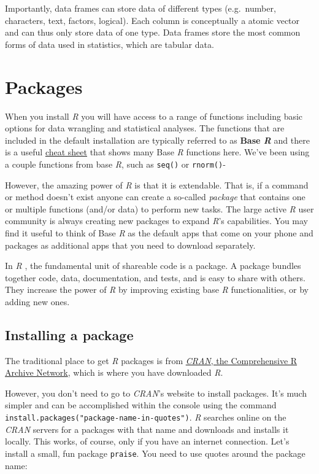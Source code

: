 \documentclass[
]{scrartcl}
\begin{document}
Importantly, data frames can store data of different types (e.g.~number, characters, text, factors, logical). Each column is conceptually a atomic vector and can thus only store data of one type. Data frames store the most common forms of data used in statistics, which are tabular data.

\hypertarget{packages}{%
\section{Packages}\label{packages}}

When you install \emph{R} you will have access to a range of functions including basic options for data wrangling and statistical analyses. The functions that are included in the default installation are typically referred to as \textbf{Base \emph{R}} and there is a useful \protect\hyperlink{cheatsheets}{cheat sheet} that shows many Base \emph{R} functions here. We've been using a couple functions from base \emph{R}, such as \texttt{seq()} or \texttt{rnorm()}-

However, the amazing power of \emph{R} is that it is extendable. That is, if a command or method doesn't exist anyone can create a so-called \emph{package} that contains one or multiple functions (and/or data) to perform new tasks. The large active \emph{R} user community is always creating new packages to expand \emph{R}'s capabilities. You may find it useful to think of Base \emph{R} as the default apps that come on your phone and packages as additional apps that you need to download separately.

In \emph{R} , the fundamental unit of shareable code is a package. A package bundles together code, data, documentation, and tests, and is easy to share with others. They increase the power of \emph{R} by improving existing base \emph{R} functionalities, or by adding new ones.

\hypertarget{installing-a-package}{%
\subsection{Installing a package}\label{installing-a-package}}

The traditional place to get \emph{R} packages is from \href{https://cran.r-project.org/}{\emph{CRAN}, the Comprehensive R Archive Network}, which is where you have downloaded \emph{R}.

However, you don't need to go to \emph{CRAN}'s website to install packages. It's much simpler and can be accomplished within the console using the command \texttt{install.packages("package-name-in-quotes")}. \emph{R} searches online on the \emph{CRAN} servers for a packages with that name and downloads and installs it locally. This works, of course, only if you have an internet connection. Let's install a small, fun package \texttt{praise}. You need to use quotes around the package name:
\end{document}
